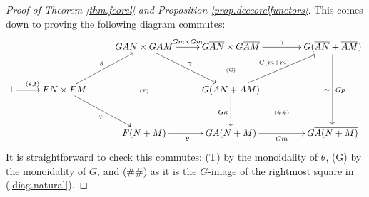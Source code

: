 \begin{proof}[Proof of Theorem \ref{thm.fcorel} and Proposition
  \ref{prop.deccorelfunctors}]
  This comes down to proving the following diagram commutes:
  \[
    \xymatrixrowsep{.8pc}
    \xymatrixcolsep{.8pc}
    \xymatrix{
      &&&& 
      GAN \times GAM \ar[rrdd]^{\gamma} \ar[rr]^{Gm \times Gm} && 
      G\overline{AN} \times G\overline{AM} \ar[rr]^{\gamma} && 
      G(\overline{AN}+\overline{AM}) \ar[dddd]^{Gp}_\sim \\ 
      &&&&&& 
      \textrm{\tiny(G)} \\
      1 \ar[rr]^(.4){\langle s,t \rangle} && 
      FN\times FM \ar[uurr]^{\theta} \ar[ddrr]_{\varphi} && 
      \textrm{\tiny(T)} && 
      G(AN+AM) \ar[uurr]^{G(m+m)} \ar[dd]_{G\kappa} \\
      &&&&&&& 
      \textrm{\tiny(\#\#)}\\ 
      &&&& 
      F(N+M) \ar[rr]_{\theta} && 
      GA(N+M) \ar[rr]_{Gm} && 
      G\overline{A(N+M)}
    }
  \]
  It is straightforward to check this commutes: (T) by the monoidality of
  $\theta$, (G) by the monoidality of $G$, and (\#\#) as it is the $G$-image of
  the rightmost square in (\ref{diag.natural}).
\end{proof}

  


